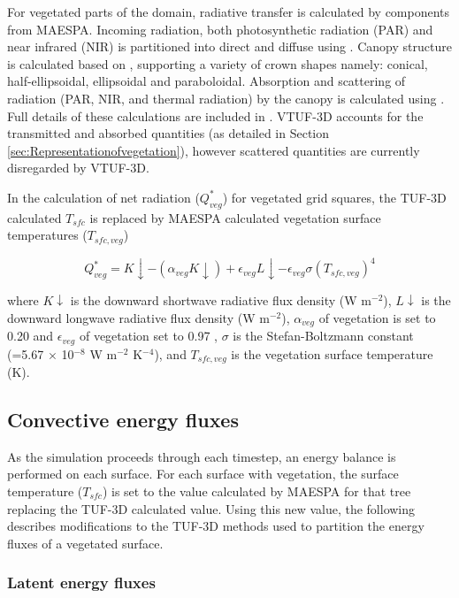 \documentclass[final,3p,times,authoryear]{elsarticle}
\begin{document}
For vegetated parts of the domain, radiative transfer is calculated by components from MAESPA. Incoming radiation, both photosynthetic radiation (PAR) and near infrared (NIR) is partitioned into direct and diffuse using \cite{Weiss1985}. Canopy structure is calculated based on \cite{Wang1990}, supporting a variety of crown shapes namely: conical, half-ellipsoidal, ellipsoidal and paraboloidal. Absorption and scattering of radiation (PAR, NIR, and thermal radiation) by the canopy is calculated using \cite{Norman1979}. Full details of these calculations are included in \cite{Duursma2012}. VTUF-3D accounts for the transmitted and absorbed quantities (as detailed in Section \ref{sec:Representationofvegetation}), however scattered quantities are currently disregarded by VTUF-3D.

In the calculation of net radiation ($Q^{*}_{veg}$) for vegetated grid squares, the TUF-3D calculated $T_{sfc}$ is replaced by MAESPA calculated vegetation surface temperatures ($T_{sfc,veg}$) 

\begin{equation}\label{eq:rnet}
Q^{*}_{veg} = K\downarrow - (\alpha _{veg} K\downarrow) + \epsilon _{veg} L\downarrow - \epsilon _{veg} \sigma  (T_{sfc,veg}) ^{4} 
\end{equation}

where $K\downarrow$ is the downward shortwave radiative flux density (W m$^{-2}$), $L\downarrow$ is the downward longwave radiative flux density (W m$^{-2}$), $\alpha _{veg}$ of vegetation is set to 0.20 and $\epsilon _{veg}$ of vegetation set to 0.97 \citep[p. 12]{Oke1987z}, $\sigma$ is the Stefan-Boltzmann constant (=5.67 $\times$ 10$^{-8}$ W m$^{-2}$ K$^{-4}$), and $T_{sfc,veg}$ is the vegetation surface temperature (K).

\subsection{Convective energy fluxes}

As the simulation proceeds through each timestep, an energy balance is performed on each surface. For each surface with vegetation, the surface temperature ($T_{sfc}$) is set to the value calculated by MAESPA for that tree replacing the TUF-3D calculated value. Using this new value, the following describes modifications to the TUF-3D methods used to partition the energy fluxes of a vegetated surface.

\subsubsection{Latent energy fluxes}
\label{sec:calcleaftemp}
\label{sec:waterbalance}
\end{document}
